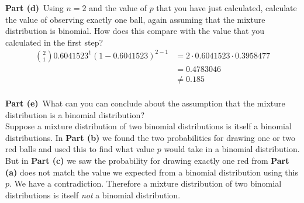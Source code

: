 \documentclass[12pt]{article}
\theoremstyle{definition}
\begin{document}
\vspace{3in}
\noindent
{\bf Part (d)}\ Using $n = 2$ and the value of $p$ that you have just calculated, calculate the value of observing exactly one ball, again assuming that the mixture distribution is binomial. How does this compare with the value that you calculated in the first step?
\begin{align*}
\binom{2}{1}0.6041523^1(1-0.6041523)^{2-1} &= 2 \cdot 0.6041523 \cdot 0.3958477\\
&= 0.4783046\\
&\neq 0.185\\
\end{align*}

\newpage
\noindent
{\bf Part (e)}\ What can you can conclude about the assumption that the mixture distribution is a binomial distribution?\\

Suppose a mixture distribution of two binomial distributions is itself a binomial distributions. In \textbf{Part (b)} we found the two probabilities for drawing one or two red balls and used this to find what value $p$ would take in a binomial distribution. But in \textbf{Part (c)} we saw the probability for drawing exactly one red from \textbf{Part (a)} does not match the value we expected from a binomial distribution using this $p$. We have a contradiction. Therefore a mixture distribution of two binomial distributions is itself \textit{not} a binomial distribution.
\end{document}
